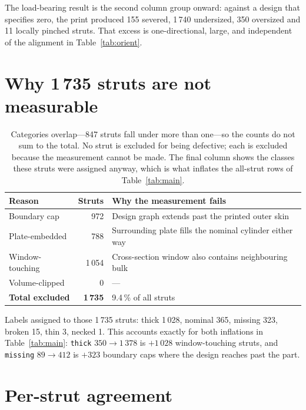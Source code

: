 \documentclass[11pt]{article}
\begin{document}
\noindent
The load-bearing result is the second column group onward: against a design that
specifies zero, the print produced 155 severed, 1\,740 undersized, 350 oversized and 11
locally pinched struts. That excess is one-directional, large, and independent of the
alignment in Table~\ref{tab:orient}.

\section{Why 1\,735 struts are not measurable}

\begin{table}[h]
\centering
\caption{Categories overlap---847 struts fall under more than one---so the counts do not
sum to the total. No strut is excluded for being defective; each is excluded because the
measurement cannot be made. The final column shows the classes these struts were assigned
anyway, which is what inflates the all-strut rows of Table~\ref{tab:main}.}
\label{tab:exclusions}
\small
\begin{tabular}{lrl}
\toprule
Reason & Struts & Why the measurement fails \\
\midrule
Boundary cap    & 972    & Design graph extends past the printed outer skin \\
Plate-embedded  & 788    & Surrounding plate fills the nominal cylinder either way \\
Window-touching & 1\,054 & Cross-section window also contains neighbouring bulk \\
Volume-clipped  & 0      & --- \\
\midrule
\textbf{Total excluded} & \textbf{1\,735} & 9.4\,\% of all struts \\
\bottomrule
\end{tabular}

\vspace{0.6em}
\small
Labels assigned to those 1\,735 struts: thick 1\,028, nominal 365, missing 323,
broken 15, thin 3, necked 1. This accounts exactly for both inflations in
Table~\ref{tab:main}: \texttt{thick} $350\to1\,378$ is $+1\,028$ window-touching struts,
and \texttt{missing} $89\to412$ is $+323$ boundary caps where the design reaches past the
part.
\end{table}

\section{Per-strut agreement}
\end{document}
